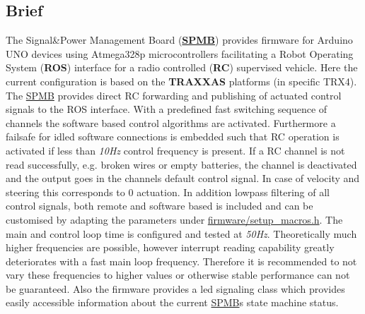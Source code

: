 \subsection*{Brief}

The Signal\&Power Management Board ({\bfseries \hyperlink{namespaceSPMB}{S\+P\+MB}}) provides firmware for Arduino U\+NO devices using Atmega328p microcontrollers facilitating a Robot Operating System ({\bfseries R\+OS}) interface for a radio controlled ({\bfseries RC}) supervised vehicle. Here the current configuration is based on the {\bfseries T\+R\+A\+X\+X\+AS} platforms (in specific T\+R\+X4). The \hyperlink{namespaceSPMB}{S\+P\+MB} provides direct RC forwarding and publishing of actuated control signals to the R\+OS interface. With a predefined fast switching sequence of channels the software based control algorithms are activated. Furthermore a failsafe for idled software connections is embedded such that RC operation is activated if less than {\itshape 10\+Hz} control frequency is present. If a RC channel is not read successfully, e.\+g. broken wires or empty batteries, the channel is deactivated and the output goes in the channels default control signal. In case of velocity and steering this corresponds to 0 actuation. In addition lowpass filtering of all control signals, both remote and software based is included and can be customised by adapting the parameters under {\ttfamily \hyperlink{setup__macros_8h_source}{firmware/setup\+\_\+macros.\+h}}. The main and control loop time is configured and tested at {\itshape 50\+Hz}. Theoretically much higher frequencies are possible, however interrupt reading capability greatly deteriorates with a fast main loop frequency. Therefore it is recommended to not vary these frequencies to higher values or otherwise stable performance can not be guaranteed. Also the firmware provides a led signaling class which provides easily accessible information about the current \hyperlink{namespaceSPMB}{S\+P\+MB}\textquotesingle{}s state machine status.



